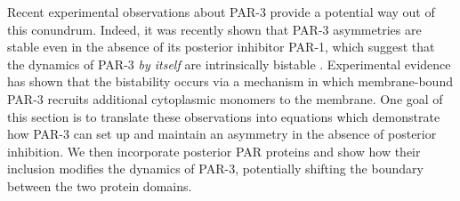 \documentclass[11pt]{article}
\newcommand{\6}[1]{#1_{\text{6}}}
\newcommand{\3}[1]{#1_{\text{3}}}
\begin{document}
Recent experimental observations about PAR-3 provide a potential way out of this conundrum. Indeed, it was recently shown that PAR-3 asymmetries are stable even in the absence of its posterior inhibitor PAR-1, which suggest that the dynamics of PAR-3 \emph{by itself} are intrinsically bistable \cite{lang2023oligomerization}. Experimental evidence has shown that the bistability occurs via a mechanism in which membrane-bound PAR-3 recruits additional cytoplasmic monomers to the membrane. One goal of this section is to translate these observations into equations which demonstrate how PAR-3 can set up and maintain an asymmetry in the absence of posterior inhibition. We then incorporate posterior PAR proteins and show how their inclusion modifies the dynamics of PAR-3, potentially shifting the boundary between the two protein domains. 
\end{document}
